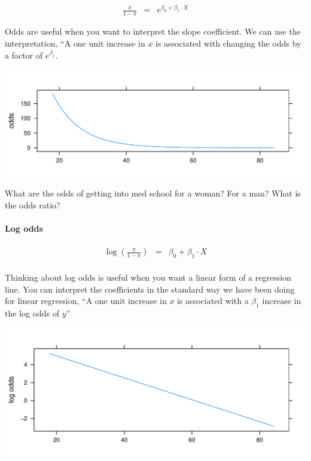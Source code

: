 \documentclass[10pt]{article}\usepackage[]{graphicx}\usepackage[]{color}
\makeatletter
\def\maxwidth{ %
  \ifdim\Gin@nat@width>\linewidth
    \linewidth
  \else
    \Gin@nat@width
  \fi
}
\newenvironment{knitrout}{}{} %
\makeatother
\begin{document}
		\begin{eqnarray*}
	    \frac{\pi}{1-\pi} &=& e^{\beta_0 + \beta_1\cdot X}
		\end{eqnarray*}

Odds are useful when you want to interpret the slope coefficient. We can use the interpretation, ``A one unit increase in $x$ is associated with changing the odds by a factor of $e^{\beta_1}$. 

\begin{knitrout}\footnotesize
{}\color{fgcolor}
\includegraphics[width=\maxwidth]{figure/unnamed-chunk-5-1} 

\end{knitrout}

What are the odds of getting into med school for a woman? For a man? What is the odds ratio?
\vspace{0.5in}
\paragraph{Log odds}
	\begin{eqnarray*}
			\log \left( \frac{\pi}{1-\pi} \right) &=& \beta_0 + \beta_1\cdot X \\
		\end{eqnarray*}
		
		Thinking about log odds is useful when you want a linear form of a regression line. You can interpret the coefficients in the standard way we have been doing for linear regression, ``A one unit increase in $x$ is associated with a $\beta_1$ increase in the log odds of $y$''
		
\begin{knitrout}\footnotesize
{}\color{fgcolor}
\includegraphics[width=\maxwidth]{figure/unnamed-chunk-6-1} 

\end{knitrout}
	
\end{document}
